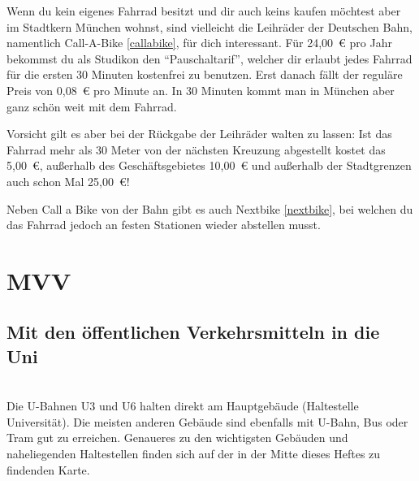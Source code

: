 Wenn du kein eigenes Fahrrad besitzt und dir auch keins kaufen möchtest aber im Stadtkern München wohnst, sind vielleicht die Leihräder der Deutschen Bahn, namentlich Call-A-Bike \ref{callabike}, für dich interessant. Für 24,00~€ pro Jahr bekommst du als Studikon den "`Pauschaltarif"', welcher dir erlaubt jedes Fahrrad für die ersten 30 Minuten kostenfrei zu benutzen. Erst danach fällt der reguläre Preis von 0,08~€ pro Minute an. In 30 Minuten kommt man in München aber ganz schön weit mit dem Fahrrad.

Vorsicht gilt es aber bei der Rückgabe der Leihräder walten zu lassen: Ist das Fahrrad mehr als 30 Meter von der nächsten Kreuzung abgestellt kostet das 5,00~€, außerhalb des Geschäftsgebietes 10,00~€ und außerhalb der Stadtgrenzen auch schon Mal 25,00~€!

Neben Call a Bike von der Bahn gibt es auch Nextbike \ref{nextbike}, bei welchen du das Fahrrad jedoch an festen Stationen wieder abstellen musst.

\begin{urlList}
\end{urlList}



\section{MVV}

\subsection*{Mit den öffentlichen Verkehrsmitteln in die Uni}\hfill\\
Die U-Bahnen U3 und U6 halten direkt am Hauptgebäude (Haltestelle Universität). Die meisten anderen Gebäude sind ebenfalls mit U-Bahn, Bus oder Tram gut zu erreichen. Genaueres zu den wichtigsten Gebäuden und naheliegenden Haltestellen finden sich auf der in der Mitte dieses Heftes zu findenden Karte.

